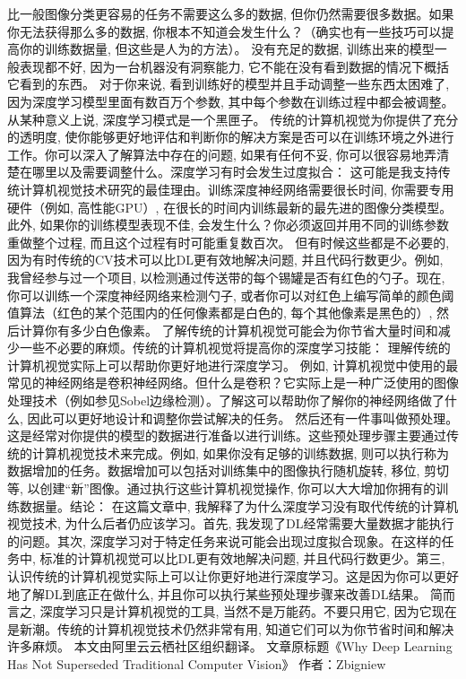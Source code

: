 比一般图像分类更容易的任务不需要这么多的数据, 但你仍然需要很多数据。如果你无法获得那么多的数据, 你根本不知道会发生什么？（确实也有一些技巧可以提高你的训练数据量, 但这些是人为的方法）。
没有充足的数据, 训练出来的模型一般表现都不好, 因为一台机器没有洞察能力, 它不能在没有看到数据的情况下概括它看到的东西。
对于你来说, 看到训练好的模型并且手动调整一些东西太困难了, 因为深度学习模型里面有数百万个参数, 其中每个参数在训练过程中都会被调整。从某种意义上说, 深度学习模式是一个黑匣子。
传统的计算机视觉为你提供了充分的透明度, 使你能够更好地评估和判断你的解决方案是否可以在训练环境之外进行工作。你可以深入了解算法中存在的问题, 如果有任何不妥, 你可以很容易地弄清楚在哪里以及需要调整什么。深度学习有时会发生过度拟合：
这可能是我支持传统计算机视觉技术研究的最佳理由。训练深度神经网络需要很长时间, 你需要专用硬件（例如, 高性能GPU）, 在很长的时间内训练最新的最先进的图像分类模型。
此外, 如果你的训练模型表现不佳, 会发生什么？你必须返回并用不同的训练参数重做整个过程, 而且这个过程有时可能重复数百次。
但有时候这些都是不必要的, 因为有时传统的CV技术可以比DL更有效地解决问题, 并且代码行数更少。例如, 我曾经参与过一个项目, 以检测通过传送带的每个锡罐是否有红色的勺子。现在, 你可以训练一个深度神经网络来检测勺子, 或者你可以对红色上编写简单的颜色阈值算法（红色的某个范围内的任何像素都是白色的, 每个其他像素是黑色的）, 然后计算你有多少白色像素。
了解传统的计算机视觉可能会为你节省大量时间和减少一些不必要的麻烦。传统的计算机视觉将提高你的深度学习技能：
理解传统的计算机视觉实际上可以帮助你更好地进行深度学习。
例如, 计算机视觉中使用的最常见的神经网络是卷积神经网络。但什么是卷积？它实际上是一种广泛使用的图像处理技术（例如参见Sobel边缘检测）。了解这可以帮助你了解你的神经网络做了什么, 因此可以更好地设计和调整你尝试解决的任务。
然后还有一件事叫做预处理。这是经常对你提供的模型的数据进行准备以进行训练。这些预处理步骤主要通过传统的计算机视觉技术来完成。例如, 如果你没有足够的训练数据, 则可以执行称为数据增加的任务。数据增加可以包括对训练集中的图像执行随机旋转, 移位, 剪切等, 以创建“新”图像。通过执行这些计算机视觉操作, 你可以大大增加你拥有的训练数据量。结论：
在这篇文章中, 我解释了为什么深度学习没有取代传统的计算机视觉技术, 为什么后者仍应该学习。首先, 我发现了DL经常需要大量数据才能执行的问题。其次, 深度学习对于特定任务来说可能会出现过度拟合现象。在这样的任务中, 标准的计算机视觉可以比DL更有效地解决问题, 并且代码行数更少。第三, 认识传统的计算机视觉实际上可以让你更好地进行深度学习。这是因为你可以更好地了解DL到底正在做什么, 并且你可以执行某些预处理步骤来改善DL结果。
简而言之, 深度学习只是计算机视觉的工具, 当然不是万能药。不要只用它, 因为它现在是新潮。传统的计算机视觉技术仍然非常有用, 知道它们可以为你节省时间和解决许多麻烦。
本文由阿里云云栖社区组织翻译。
文章原标题《Why Deep Learning Has Not Superseded Traditional Computer Vision》
作者：Zbigniew


